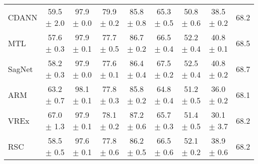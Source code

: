 \documentclass{article}
\begin{document}
\begin{center}
{\begin{tabular}{lcccccccc}
CDANN                     & 59.5 $\pm$ 2.0            & 97.9 $\pm$ 0.0            & 79.9 $\pm$ 0.2            & 85.8 $\pm$ 0.8            & 65.3 $\pm$ 0.5            & 50.8 $\pm$ 0.6            & 38.5 $\pm$ 0.2            & 68.2                      \\
MTL                       & 57.6 $\pm$ 0.3            & 97.9 $\pm$ 0.1            & 77.7 $\pm$ 0.5            & 86.7 $\pm$ 0.2            & 66.5 $\pm$ 0.4            & 52.2 $\pm$ 0.4            & 40.8 $\pm$ 0.1            & 68.5                      \\
SagNet                    & 58.2 $\pm$ 0.3            & 97.9 $\pm$ 0.0            & 77.6 $\pm$ 0.1            & 86.4 $\pm$ 0.4            & 67.5 $\pm$ 0.2            & 52.5 $\pm$ 0.4            & 40.8 $\pm$ 0.2            & 68.7                      \\
ARM                       & 63.2 $\pm$ 0.7            & 98.1 $\pm$ 0.1            & 77.8 $\pm$ 0.3            & 85.8 $\pm$ 0.2            & 64.8 $\pm$ 0.4            & 51.2 $\pm$ 0.5            & 36.0 $\pm$ 0.2            & 68.1                      \\
VREx                      & 67.0 $\pm$ 1.3            & 97.9 $\pm$ 0.1            & 78.1 $\pm$ 0.2            & 87.2 $\pm$ 0.6            & 65.7 $\pm$ 0.3            & 51.4 $\pm$ 0.5            & 30.1 $\pm$ 3.7            & 68.2                      \\
RSC                       & 58.5 $\pm$ 0.5            & 97.6 $\pm$ 0.1            & 77.8 $\pm$ 0.6            & 86.2 $\pm$ 0.5            & 66.5 $\pm$ 0.6            & 52.1 $\pm$ 0.2            & 38.9 $\pm$ 0.6            & 68.2                      \\
\bottomrule
\end{tabular}}
\end{center}
\end{document}
